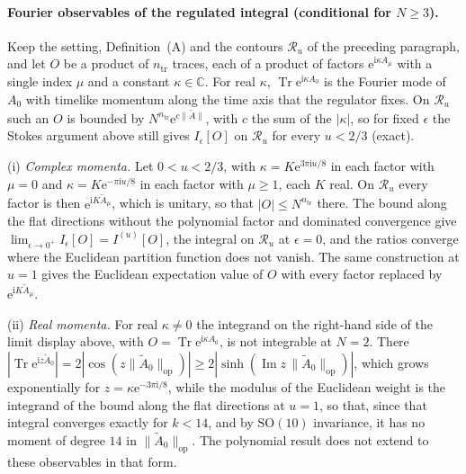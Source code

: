 \paragraph{Fourier observables of the regulated integral (conditional for \(N\ge3\)).}
Keep the setting, Definition~(A) and the contours \(\mathcal R_u\) of the preceding paragraph, and let \(O\) be a product of \(n_{\mathrm{tr}}\) traces, each of a product of factors \(\mathrm e^{\mathrm i\kappa A_\mu}\) with a single index \(\mu\) and a constant \(\kappa\in\mathbb C\). For real \(\kappa\), \(\operatorname{Tr}\mathrm e^{\mathrm i\kappa A_0}\) is the Fourier mode of \(A_0\) with timelike momentum along the time axis that the regulator fixes. On \(\mathcal R_u\) such an \(O\) is bounded by \(N^{n_{\mathrm{tr}}}\mathrm e^{c\|\tilde A\|}\), with \(c\) the sum of the \(|\kappa|\), so for fixed \(\epsilon\) the Stokes argument above still gives \(I_\epsilon[O]\) on \(\mathcal R_u\) for every \(u<2/3\) (exact).

(i) \emph{Complex momenta.} Let \(0<u<2/3\), with \(\kappa=K\mathrm e^{3\pi\mathrm iu/8}\) in each factor with \(\mu=0\) and \(\kappa=K\mathrm e^{-\pi\mathrm iu/8}\) in each factor with \(\mu\ge1\), each \(K\) real. On \(\mathcal R_u\) every factor is then \(\mathrm e^{\mathrm iK\tilde A_\mu}\), which is unitary, so that \(|O|\le N^{n_{\mathrm{tr}}}\) there. The bound along the flat directions without the polynomial factor and dominated convergence give \(\lim_{\epsilon\to0^+}I_\epsilon[O]=I^{(u)}[O]\), the integral on \(\mathcal R_u\) at \(\epsilon=0\), and the ratios converge where the Euclidean partition function does not vanish. The same construction at \(u=1\) gives the Euclidean expectation value of \(O\) with every factor replaced by \(\mathrm e^{\mathrm iK\tilde A_\mu}\).

(ii) \emph{Real momenta.} For real \(\kappa\neq0\) the integrand on the right-hand side of the limit display above, with \(O=\operatorname{Tr}\mathrm e^{\mathrm i\kappa A_0}\), is not integrable at \(N=2\). There \(|\operatorname{Tr}\mathrm e^{\mathrm iz\tilde A_0}|=2|\cos(z\|\tilde A_0\|_{\mathrm{op}})|\ge2|\sinh(\operatorname{Im}z\,\|\tilde A_0\|_{\mathrm{op}})|\), which grows exponentially for \(z=\kappa\mathrm e^{-3\pi\mathrm i/8}\), while the modulus of the Euclidean weight is the integrand of the bound along the flat directions at \(u=1\), so that, since that integral converges exactly for \(k<14\), and by \(\mathrm{SO}(10)\) invariance, it has no moment of degree \(14\) in \(\|\tilde A_0\|_{\mathrm{op}}\). The polynomial result does not extend to these observables in that form.

